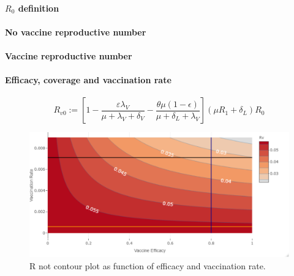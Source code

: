 \paragraph{$R_0$ definition}
\paragraph{No  vaccine reproductive number}
\paragraph{Vaccine reproductive number}
\paragraph{Efficacy, coverage and vaccination rate}

%

\begin{equation*}
 R_{v0} := \left[ 1-\frac{\varepsilon \lambda_V}
 {\mu+\lambda_V+\delta_V}
 -\frac{\theta\mu(1-\epsilon)}{\mu+\delta_L+\lambda_V}\right]
 (\mu R_1+\delta_L)R_0
\end{equation*}
%
\begin{figure}[tbh]
    \centering
      \includegraphics[scale=0.5, keepaspectratio]{Figures/Rv_contour}
    \caption{R not contour plot as function of efficacy and vaccination rate.}
    \label{fig:rvcontour1}
\end{figure}



